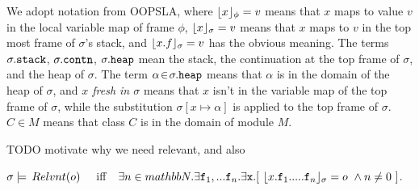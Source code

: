 We adopt notation from OOPSLA, where
 $\lfloor x \rfloor_{\phi} = v$  means that $x$ maps to
value $v$ in the local variable map of frame $\phi$, $\lfloor x \rfloor_{\sigma} = v$ means that $x$ 
maps to $v$ in the top most frame of $\sigma$'s stack, and $\lfloor x.f \rfloor_{\sigma} = v$
has the obvious meaning. The terms $\sigma.{\texttt{stack}}$,  
$\sigma.{\texttt{contn}}$,  
$\sigma.{\texttt{heap}}$     mean the stack, 
the continuation at the
top frame of $\sigma$, %
and the heap of $\sigma$.
The term $\alpha\!\in\!\sigma.{\texttt{heap}}$ means that $\alpha$ is in the domain of the heap of $\sigma$, and \emph{$x$ fresh in $\sigma$} means that 
$x$ isn't in the variable map of the top frame of $\sigma$, 
while the substitution  $\sigma[x \mapsto \alpha]$ is applied to the top frame of $\sigma$.
 \ $C\in M$ means that class $C$ is in the domain of module $M$. 

TODO motivate why we need relevant, and also 
\begin{definition}
$\sigma \models \,Relvnt(o)$ \ \ iff\ \  
$\exists n\in mathbb{N}.\exists \prg{f}_1,... \prg{f}_n.\exists \prg{x}.[ \ \interpret{\sigma}{x.\prg{f}_1.....\prg{f}_n} = o \ \wedge n\neq 0\ ]$.
\end{definition}

